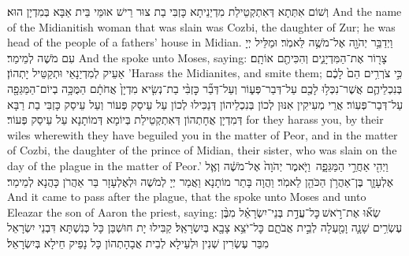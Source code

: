 {וְשׁוֹם אִתְּתָא דְּאִתְקְטֵילַת מִדְיַנֵיתָא כָּזְבִּי בַת צוּר רֵישׁ אוּמֵּי בֵּית אַבָּא בְּמִדְיָן הוּא׃}
{And the name of the Midianitish woman that was slain was Cozbi, the daughter of Zur; he was head of the people of a fathers’ house in Midian.}{}
{וַיְדַבֵּ֥ר יְהֹוָ֖ה אֶל־מֹשֶׁ֥ה לֵּאמֹֽר׃}
{וּמַלֵּיל יְיָ עִם מֹשֶׁה לְמֵימַר׃}
{And the \lord\space spoke unto Moses, saying:}{}
{צָר֖וֹר אֶת־הַמִּדְיָנִ֑ים וְהִכִּיתֶ֖ם אוֹתָֽם׃
}
{אַעֵיק לְמִדְיַנָאֵי וּתְקַטֵּיל יָתְהוֹן׃}
{’Harass the Midianites, and smite them;}{}
{כִּ֣י צֹרְרִ֥ים הֵם֙ לָכֶ֔ם בְּנִכְלֵיהֶ֛ם אֲשֶׁר־נִכְּל֥וּ לָכֶ֖ם עַל־דְּבַר־פְּע֑וֹר וְעַל־דְּבַ֞ר כׇּזְבִּ֨י בַת־נְשִׂ֤יא מִדְיָן֙ אֲחֹתָ֔ם הַמֻּכָּ֥ה בְיוֹם־הַמַּגֵּפָ֖ה עַל־דְּבַר־פְּעֽוֹר׃
}
{אֲרֵי מְעִיקִין אִנּוּן לְכוֹן בְּנִכְלֵיהוֹן דְּנַכִּילוּ לְכוֹן עַל עֵיסַק פְּעוֹר וְעַל עֵיסַק כָּזְבִּי בַת רַבָּא דְּמִדְיָן אֲחָתְהוֹן דְּאִתְקְטֵילַת בְּיוֹמָא דְּמוֹתָנָא עַל עֵיסַק פְּעוֹר׃}
{for they harass you, by their wiles wherewith they have beguiled you in the matter of Peor, and in the matter of Cozbi, the daughter of the prince of Midian, their sister, who was slain on the day of the plague in the matter of Peor.’}{}
\newperek
{}%
{וַיְהִ֖י אַחֲרֵ֣י הַמַּגֵּפָ֑ה \petucha  וַיֹּ֤אמֶר יְהֹוָה֙ אֶל־מֹשֶׁ֔ה וְאֶ֧ל אֶלְעָזָ֛ר בֶּן־אַהֲרֹ֥ן הַכֹּהֵ֖ן לֵאמֹֽר׃
}
{וַהֲוָה בָּתַר מוֹתָנָא וַאֲמַר יְיָ לְמֹשֶׁה וּלְאֶלְעָזָר בַּר אַהֲרֹן כָּהֲנָא לְמֵימַר׃}
{And it came to pass after the plague, that the \lord\space spoke unto Moses and unto Eleazar the son of Aaron the priest, saying:}{}
{שְׂא֞וּ אֶת־רֹ֣אשׁ \legarmeh  כׇּל־עֲדַ֣ת בְּנֵי־יִשְׂרָאֵ֗ל מִבֶּ֨ן עֶשְׂרִ֥ים שָׁנָ֛ה וָמַ֖עְלָה לְבֵ֣ית אֲבֹתָ֑ם כׇּל־יֹצֵ֥א צָבָ֖א בְּיִשְׂרָאֵֽל׃
}
{קַבִּילוּ יָת חוּשְׁבַּן כָּל כְּנִשְׁתָּא דִּבְנֵי יִשְׂרָאֵל מִבַּר עֶשְׂרִין שְׁנִין וּלְעֵילָא לְבֵית אֲבָהָתְהוֹן כָּל נָפֵיק חֵילָא בְּיִשְׂרָאֵל׃}
